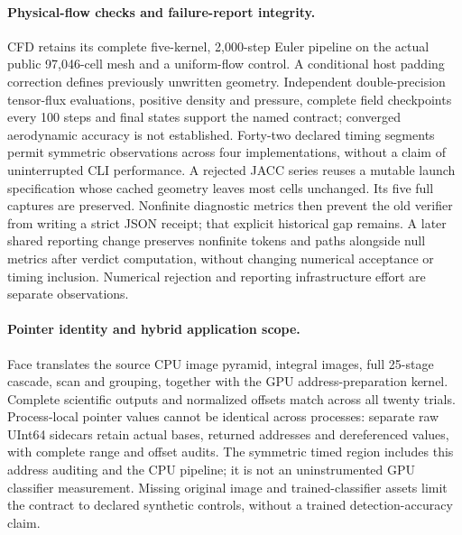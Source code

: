 \paragraph{Physical-flow checks and failure-report integrity.}
CFD retains its complete five-kernel, 2,000-step Euler pipeline on the actual public 97,046-cell mesh and a uniform-flow control. A conditional host padding correction defines previously unwritten geometry. Independent double-precision tensor-flux evaluations, positive density and pressure, complete field checkpoints every 100 steps and final states support the named contract; converged aerodynamic accuracy is not established. Forty-two declared timing segments permit symmetric observations across four implementations, without a claim of uninterrupted CLI performance. A rejected JACC series reuses a mutable launch specification whose cached geometry leaves most cells unchanged. Its five full captures are preserved. Nonfinite diagnostic metrics then prevent the old verifier from writing a strict JSON receipt; that explicit historical gap remains. A later shared reporting change preserves nonfinite tokens and paths alongside null metrics after verdict computation, without changing numerical acceptance or timing inclusion. Numerical rejection and reporting infrastructure effort are separate observations.

\paragraph{Pointer identity and hybrid application scope.}
Face translates the source CPU image pyramid, integral images, full 25-stage cascade, scan and grouping, together with the GPU address-preparation kernel. Complete scientific outputs and normalized offsets match across all twenty trials. Process-local pointer values cannot be identical across processes: separate raw UInt64 sidecars retain actual bases, returned addresses and dereferenced values, with complete range and offset audits. The symmetric timed region includes this address auditing and the CPU pipeline; it is not an uninstrumented GPU classifier measurement. Missing original image and trained-classifier assets limit the contract to declared synthetic controls, without a trained detection-accuracy claim.

